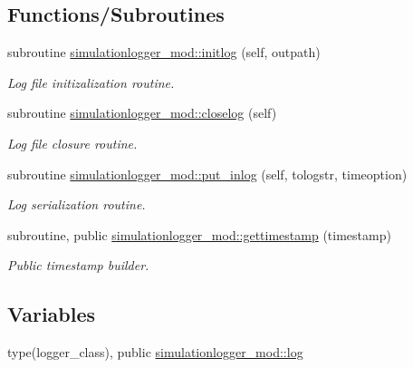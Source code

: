 \subsection*{Functions/\+Subroutines}
\begin{DoxyCompactItemize}
\item 
subroutine \mbox{\hyperlink{namespacesimulationlogger__mod_aeb57075501eed504789bb5858b4e6b59}{simulationlogger\+\_\+mod\+::initlog}} (self, outpath)
\begin{DoxyCompactList}\small\item\em Log file initizalization routine. \end{DoxyCompactList}\item 
subroutine \mbox{\hyperlink{namespacesimulationlogger__mod_a9cad2fd4ad67dc229286f94b0444cb86}{simulationlogger\+\_\+mod\+::closelog}} (self)
\begin{DoxyCompactList}\small\item\em Log file closure routine. \end{DoxyCompactList}\item 
subroutine \mbox{\hyperlink{namespacesimulationlogger__mod_a3bf437b875b454ef326a3bc660542539}{simulationlogger\+\_\+mod\+::put\+\_\+inlog}} (self, tologstr, timeoption)
\begin{DoxyCompactList}\small\item\em Log serialization routine. \end{DoxyCompactList}\item 
subroutine, public \mbox{\hyperlink{namespacesimulationlogger__mod_abff1db7e1655cb59097146d78e650672}{simulationlogger\+\_\+mod\+::gettimestamp}} (timestamp)
\begin{DoxyCompactList}\small\item\em Public timestamp builder. \end{DoxyCompactList}\end{DoxyCompactItemize}
\subsection*{Variables}
\begin{DoxyCompactItemize}
\item 
type(logger\+\_\+class), public \mbox{\hyperlink{namespacesimulationlogger__mod_a0d667ffec2a1129f89f4bd8fe6dc8a43}{simulationlogger\+\_\+mod\+::log}}
\end{DoxyCompactItemize}
